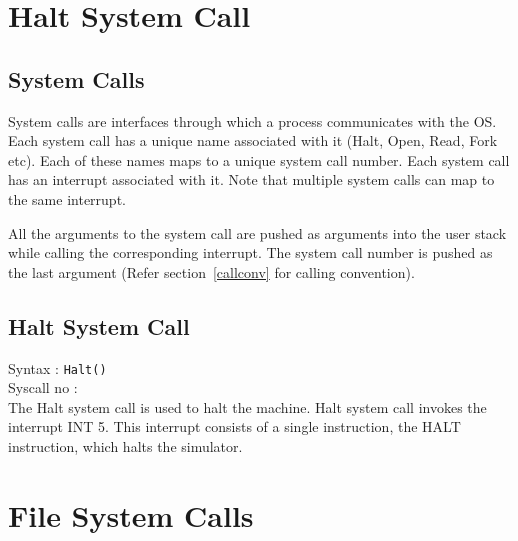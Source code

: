\documentclass[10pt]{report}
\newcommand\counter[1]{\arabic{#1} \stepcounter{#1}}
\newcounter{syscall}
\begin{document}



\chapter{Halt System Call}
\label{chp:halt_system_calls}

\section{System Calls}
System calls are interfaces through which a process communicates with the OS. Each system call has a unique name associated with it (Halt, Open, Read, Fork etc). Each of these names maps to a unique system call number. Each system call has an interrupt associated with it. Note that multiple system calls can map to the same interrupt.

All the arguments to the system call are pushed as arguments into the user stack while calling the corresponding interrupt. The system call number is pushed as the last argument (Refer section~\ref{callconv} for calling convention).

\section{Halt System Call}
\label{haltsyscall}

Syntax : \texttt{Halt()} \\
Syscall no : \counter{syscall} \\

The Halt system call is used to halt the machine. Halt system call invokes the interrupt INT 5. This interrupt consists of a single instruction, the HALT instruction, which halts the simulator.

\chapter{File System Calls}
\label{chp:file_system_calls}
\end{document}
